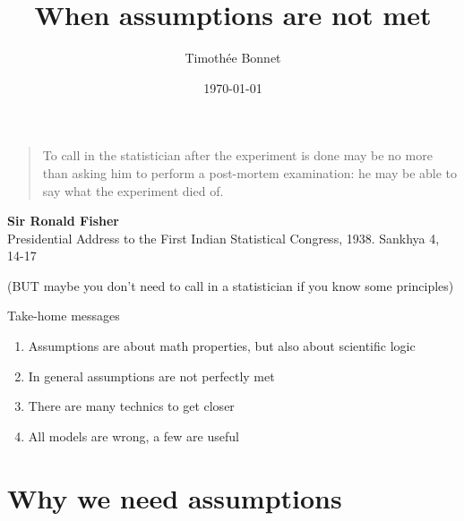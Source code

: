 \documentclass{beamer}\usepackage[]{graphicx}\usepackage[]{color}
\title[Model assumptions]{When assumptions are not met}
\author{Timoth\'ee Bonnet}
\institute[BDSI]{Biological Data Science Institute}
\date{\today}
\begin{document}




\begin{frame}{}

\begin{quote}
To call in the statistician after the experiment is done may be no more than asking him to perform a post-mortem examination: he may be able to say what the experiment died of.
\end{quote}
\textbf{Sir Ronald Fisher} \\ \footnotesize Presidential Address to the First Indian Statistical Congress, 1938. Sankhya 4, 14-17

\vfill
\normalsize
(BUT maybe you don't need to call in a statistician if you know some principles)
\end{frame}


\begin{frame}{}
\maketitle

\end{frame}

\begin{frame}{Take-home messages}
  \begin{enumerate}[<+->]
    \item Assumptions are about math properties, but also about scientific logic
    \item In general assumptions are not perfectly met
    \item There are many technics to get closer
    \item All models are wrong, a few are useful
  \end{enumerate}
\end{frame}

\section{Why we need assumptions}
\end{document}
